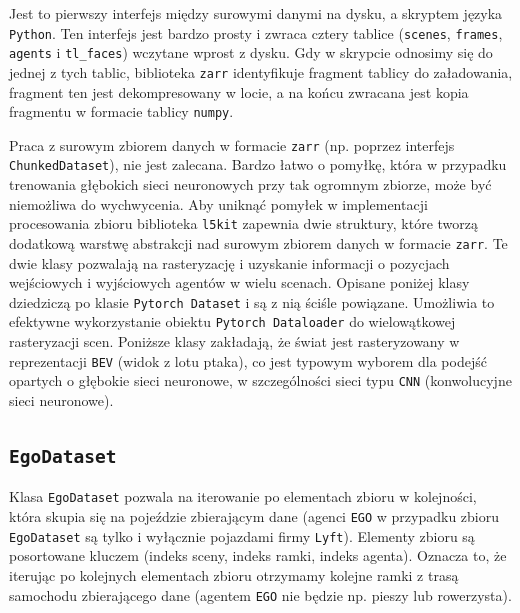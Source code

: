 Jest to pierwszy interfejs między surowymi danymi na dysku, a skryptem języka \texttt{Python}. Ten interfejs jest bardzo prosty i zwraca cztery tablice (\texttt{scenes}, \texttt{frames}, \texttt{agents} i \texttt{tl\_faces}) wczytane wprost z dysku. Gdy w skrypcie odnosimy się do jednej z tych tablic, biblioteka \texttt{zarr} identyfikuje fragment tablicy do załadowania, fragment ten jest dekompresowany w locie, a na końcu zwracana jest kopia fragmentu w formacie tablicy \texttt{numpy}.

\vspace{1em}

Praca z surowym zbiorem danych w formacie \texttt{zarr} (np. poprzez interfejs \texttt{ChunkedDataset}), nie jest zalecana. Bardzo łatwo o pomyłkę, która w przypadku trenowania głębokich sieci neuronowych przy tak ogromnym zbiorze, może być niemożliwa do wychwycenia. Aby uniknąć pomyłek w implementacji procesowania zbioru biblioteka \texttt{l5kit} zapewnia dwie struktury, które tworzą dodatkową warstwę abstrakcji nad surowym zbiorem danych w formacie \texttt{zarr}. Te dwie klasy pozwalają na rasteryzację i uzyskanie informacji o pozycjach wejściowych i wyjściowych agentów w wielu scenach. Opisane poniżej klasy dziedziczą po klasie \texttt{Pytorch Dataset} i są z nią ściśle powiązane. Umożliwia to efektywne wykorzystanie obiektu \texttt{Pytorch Dataloader} do wielowątkowej rasteryzacji scen. Poniższe klasy zakładają, że świat jest rasteryzowany w reprezentacji \texttt{BEV} (widok z lotu ptaka), co jest typowym wyborem dla podejść opartych o głębokie sieci neuronowe, w szczególności sieci typu \texttt{CNN} (konwolucyjne sieci neuronowe).

\newpage

\subsection{\texttt{EgoDataset}}

Klasa \texttt{EgoDataset} pozwala na iterowanie po elementach zbioru w kolejności, która skupia się na pojeździe zbierającym dane (agenci \texttt{EGO} w przypadku zbioru \texttt{EgoDataset} są tylko i wyłącznie pojazdami firmy \texttt{Lyft}). Elementy zbioru są posortowane kluczem (indeks sceny, indeks ramki, indeks agenta). Oznacza to, że iterując po kolejnych elementach zbioru otrzymamy kolejne ramki z trasą samochodu zbierającego dane (agentem \texttt{EGO} nie będzie np. pieszy lub rowerzysta).

